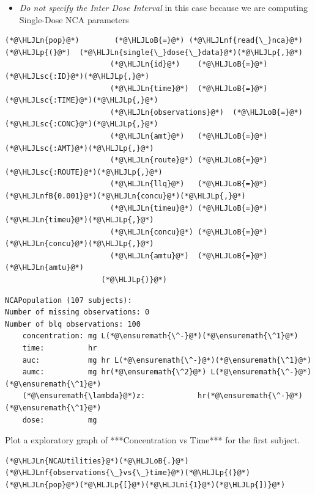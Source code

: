\documentclass[12pt,a4paper]{article}
\newcommand{\HLJLn}[1]{#1}
\newcommand{\HLJLnf}[1]{\textcolor[RGB]{66,102,213}{#1}}
\newcommand{\HLJLsc}[1]{\textcolor[RGB]{201,61,57}{#1}}
\newcommand{\HLJLnfB}[1]{\textcolor[RGB]{59,151,46}{#1}}
\newcommand{\HLJLni}[1]{\textcolor[RGB]{59,151,46}{#1}}
\newcommand{\HLJLoB}[1]{\textcolor[RGB]{102,102,102}{\textbf{#1}}}
\newcommand{\HLJLp}[1]{#1}
\begin{document}
\begin{itemize}
\item \emph{Do not specify the Inter Dose Interval} in this case because we are computing Single-Dose NCA parameters

\end{itemize}

\begin{lstlisting}
(*@\HLJLn{pop}@*)        (*@\HLJLoB{=}@*) (*@\HLJLnf{read{\_}nca}@*)(*@\HLJLp{(}@*)  (*@\HLJLn{single{\_}dose{\_}data}@*)(*@\HLJLp{,}@*)
                        (*@\HLJLn{id}@*)    (*@\HLJLoB{=}@*) (*@\HLJLsc{:ID}@*)(*@\HLJLp{,}@*)
                        (*@\HLJLn{time}@*)  (*@\HLJLoB{=}@*) (*@\HLJLsc{:TIME}@*)(*@\HLJLp{,}@*)
                        (*@\HLJLn{observations}@*)  (*@\HLJLoB{=}@*) (*@\HLJLsc{:CONC}@*)(*@\HLJLp{,}@*)
                        (*@\HLJLn{amt}@*)   (*@\HLJLoB{=}@*) (*@\HLJLsc{:AMT}@*)(*@\HLJLp{,}@*)
                        (*@\HLJLn{route}@*) (*@\HLJLoB{=}@*) (*@\HLJLsc{:ROUTE}@*)(*@\HLJLp{,}@*)
                        (*@\HLJLn{llq}@*)   (*@\HLJLoB{=}@*) (*@\HLJLnfB{0.001}@*)(*@\HLJLn{concu}@*)(*@\HLJLp{,}@*)
                        (*@\HLJLn{timeu}@*) (*@\HLJLoB{=}@*) (*@\HLJLn{timeu}@*)(*@\HLJLp{,}@*)
                        (*@\HLJLn{concu}@*) (*@\HLJLoB{=}@*) (*@\HLJLn{concu}@*)(*@\HLJLp{,}@*)
                        (*@\HLJLn{amtu}@*)  (*@\HLJLoB{=}@*) (*@\HLJLn{amtu}@*)
                      (*@\HLJLp{)}@*)
\end{lstlisting}

\begin{lstlisting}
NCAPopulation (107 subjects):
Number of missing observations: 0
Number of blq observations: 100
    concentration: mg L(*@\ensuremath{\^-}@*)(*@\ensuremath{\^1}@*)
    time:          hr
    auc:           mg hr L(*@\ensuremath{\^-}@*)(*@\ensuremath{\^1}@*)
    aumc:          mg hr(*@\ensuremath{\^2}@*) L(*@\ensuremath{\^-}@*)(*@\ensuremath{\^1}@*)
    (*@\ensuremath{\lambda}@*)z:            hr(*@\ensuremath{\^-}@*)(*@\ensuremath{\^1}@*)
    dose:          mg
\end{lstlisting}


Plot a exploratory graph of ***Concentration vs Time*** for the first subject.


\begin{lstlisting}
(*@\HLJLn{NCAUtilities}@*)(*@\HLJLoB{.}@*)(*@\HLJLnf{observations{\_}vs{\_}time}@*)(*@\HLJLp{(}@*)(*@\HLJLn{pop}@*)(*@\HLJLp{[}@*)(*@\HLJLni{1}@*)(*@\HLJLp{])}@*)
\end{lstlisting}
\end{document}

